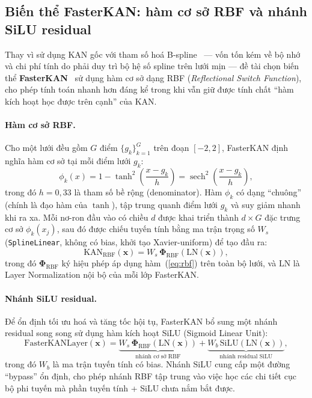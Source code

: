 \documentclass[../DoAn.tex]{subfiles}
\begin{document}
\subsection{Biến thể FasterKAN: hàm cơ sở RBF và nhánh SiLU residual}
\label{sec:fasterkan}

Thay vì sử dụng KAN gốc với tham số hoá B-spline~\cite{liuKANKolmogorovArnoldNetworks2025} --- vốn tốn kém về bộ nhớ và chi phí tính do phải duy trì bộ hệ số spline trên lưới mịn --- đề tài chọn biến thể \textbf{FasterKAN}~\cite{athanasiosFasterKANFasterKolmogorovArnold2024} sử dụng hàm cơ sở dạng RBF (\emph{Reflectional Switch Function}), cho phép tính toán nhanh hơn đáng kể trong khi vẫn giữ được tính chất ``hàm kích hoạt học được trên cạnh'' của KAN.
\vspace{-1cm}
\paragraph{Hàm cơ sở RBF.}
Cho một lưới đều gồm $G$ điểm $\{g_k\}_{k=1}^{G}$ trên đoạn $[-2, 2]$, FasterKAN định nghĩa hàm cơ sở tại mỗi điểm lưới $g_k$:
\begin{equation}
  \phi_k(x) = 1 - \tanh^2\!\left(\frac{x - g_k}{h}\right)
             = \operatorname{sech}^2\!\left(\frac{x - g_k}{h}\right),
  \label{eq:rbf}
\end{equation}
trong đó $h = 0{,}33$ là tham số bề rộng (denominator). Hàm $\phi_k$ có dạng ``chuông'' (chính là đạo hàm của $\tanh$), tập trung quanh điểm lưới $g_k$ và suy giảm nhanh khi ra xa. Mỗi nơ-ron đầu vào có chiều $d$ được khai triển thành $d \times G$ đặc trưng cơ sở $\phi_k(x_j)$, sau đó được chiếu tuyến tính bằng ma trận trọng số $W_s$ (\texttt{SplineLinear}, không có bias, khởi tạo Xavier-uniform) để tạo đầu ra:
\begin{equation}
  \mathrm{KAN}_{\text{RBF}}(\mathbf{x}) = W_s \, \boldsymbol{\Phi}_{\text{RBF}}(\mathrm{LN}(\mathbf{x})),
\end{equation}
trong đó $\boldsymbol{\Phi}_{\text{RBF}}$ ký hiệu phép áp dụng hàm~(\ref{eq:rbf}) trên toàn bộ lưới, và $\mathrm{LN}$ là Layer Normalization nội bộ của mỗi lớp FasterKAN.

\paragraph{Nhánh SiLU residual.}
Để ổn định tối ưu hoá và tăng tốc hội tụ, FasterKAN bổ sung một nhánh residual song song sử dụng hàm kích hoạt SiLU (Sigmoid Linear Unit):
\begin{equation}
  \mathrm{FasterKANLayer}(\mathbf{x})
    = \underbrace{W_s \, \boldsymbol{\Phi}_{\text{RBF}}(\mathrm{LN}(\mathbf{x}))}_\text{nhánh cơ sở RBF}
    + \underbrace{W_b \, \mathrm{SiLU}(\mathrm{LN}(\mathbf{x}))}_\text{nhánh residual SiLU},
  \label{eq:fasterkan_layer}
\end{equation}
trong đó $W_b$ là ma trận tuyến tính có bias. Nhánh SiLU cung cấp một đường ``bypass'' ổn định, cho phép nhánh RBF tập trung vào việc học các chi tiết cục bộ phi tuyến mà phần tuyến tính + SiLU chưa nắm bắt được.
\end{document}
